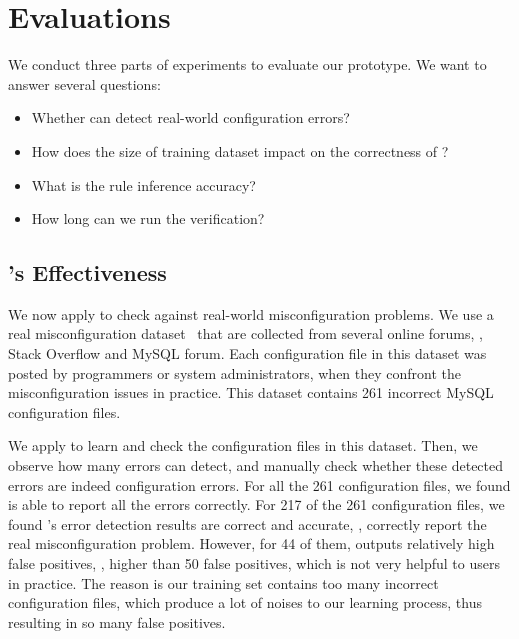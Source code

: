 
\section{Evaluations}
\label{sec-eval}

We conduct three parts of experiments to evaluate our \app
prototype. We want to answer several questions:

\begin{itemize}

\item Whether \app can detect real-world configuration errors?

\item How does the size of training dataset impact on the correctness
  of \app?

\item What is the rule inference accuracy?

\item How long can we run the verification?

\end{itemize}



\subsection{\app's Effectiveness}

We now apply \app to check against real-world misconfiguration problems.
We use a real misconfiguration dataset~\cite{xu15hey}
that are collected from several online forums, \eg, 
Stack Overflow and MySQL forum.
Each configuration file in this dataset was posted by 
programmers or system administrators, 
when they confront the misconfiguration issues in practice.
This dataset contains 261 incorrect MySQL configuration files.

We apply \app to learn and check the configuration files in this
dataset. Then, we observe how many errors \app can detect,
and manually check whether these detected errors are indeed
configuration errors.
For all the 261 configuration files, we found \app is
able to report all the errors correctly.
For 217 of the 261 configuration files, we found \app's 
error detection results are correct and accurate,
\ie, correctly report the real misconfiguration problem.
However, for 44 of them, \app outputs relatively high false positives,
\eg, higher than 50 false positives,
which is not very helpful to users in practice.
The reason is our training set contains too many incorrect configuration
files, which produce a lot of noises to our learning process,
thus resulting in so many false positives.
  
